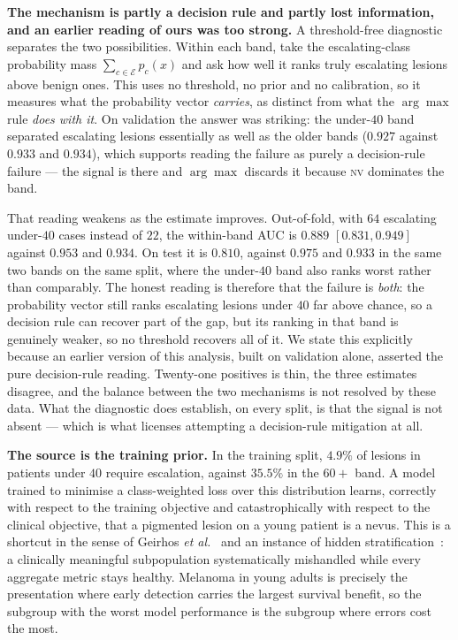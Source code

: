 \documentclass[journal]{IEEEtran}
\begin{document}
\textbf{The mechanism is partly a decision rule and partly lost information, and an earlier
reading of ours was too strong.} A threshold-free diagnostic separates the two possibilities.
Within each band, take the escalating-class probability mass $\sum_{c \in \mathcal{E}} p_c(x)$
and ask how well it ranks truly escalating lesions above benign ones. This uses no threshold,
no prior and no calibration, so it measures what the probability vector \emph{carries}, as
distinct from what the $\arg\max$ rule \emph{does with it}. On validation the answer was
striking: the under-$40$ band separated escalating lesions essentially as well as the older
bands ($0.927$ against $0.933$ and $0.934$), which supports reading the failure as purely a
decision-rule failure --- the signal is there and $\arg\max$ discards it because \textsc{nv}
dominates the band.

That reading weakens as the estimate improves. Out-of-fold, with $64$ escalating under-$40$
cases instead of $22$, the within-band AUC is $0.889$ $[0.831, 0.949]$ against $0.953$ and
$0.934$. On test it is $0.810$, against $0.975$ and $0.933$ in the same two bands on the same
split, where the under-$40$ band also ranks worst rather than comparably. The honest reading
is therefore that the failure is \emph{both}: the probability vector still ranks escalating
lesions under $40$ far above chance, so a decision rule can recover part of the gap, but its
ranking in that band is genuinely weaker, so no threshold recovers all of it. We state this
explicitly because an earlier version of this analysis, built on validation alone, asserted
the pure decision-rule reading. Twenty-one positives is thin, the three estimates disagree,
and the balance between the two mechanisms is not resolved by these data. What the diagnostic
does establish, on every split, is that the signal is not absent --- which is what licenses
attempting a decision-rule mitigation at all.

\textbf{The source is the training prior.} In the training split, $4.9\%$ of lesions in
patients under $40$ require escalation, against $35.5\%$ in the $60+$ band. A model trained to
minimise a class-weighted loss over this distribution learns, correctly with respect to the
training objective and catastrophically with respect to the clinical objective, that a
pigmented lesion on a young patient is a nevus. This is a shortcut in the sense of Geirhos
\emph{et al.}~\cite{geirhos2020shortcut} and an instance of hidden
stratification~\cite{oakdenrayner2020hidden}: a clinically meaningful subpopulation
systematically mishandled while every aggregate metric stays healthy. Melanoma in young adults
is precisely the presentation where early detection carries the largest survival benefit, so
the subgroup with the worst model performance is the subgroup where errors cost the most.
\end{document}
